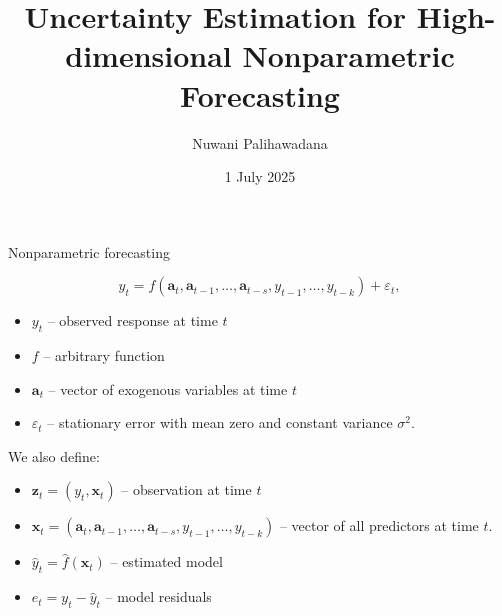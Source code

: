 \documentclass[
  12pt,
  ignorenonframetext,
  aspectratio=169,
]{beamer}
\title{Uncertainty Estimation for High-dimensional Nonparametric
Forecasting}
\author{Nuwani Palihawadana}
\date{1 July 2025}
\begin{document}
\frame{\titlepage}


\begin{frame}{Nonparametric forecasting}
\label{nonparametric-forecasting}
\begin{block}{}
$$
 y_t = f(\bm{a}_{t}, \bm{a}_{t-1}, \dots,\bm{a}_{t-s}, y_{t-1},\dots,y_{t-k}) + \varepsilon_{t},
$$
\end{block}

\begin{itemize}
  \item \small \color{black} $y_{t}$ -- \color{violet} observed response at time $t$
  \item \small \color{black} $f$ -- \color{violet} arbitrary function
  \item \small \color{black} $\bm{a}_{t}$ -- \color{violet} vector of exogenous variables at time $t$
  \item \small \color{black} $\varepsilon_{t}$ -- \color{violet} stationary error with mean zero and constant variance $\sigma^2$. 
\end{itemize}

\pause

We also define:

\begin{itemize}
  \item \small \color{black} $\bm{z}_{t} = (y_{t}, \bm{x}_{t})$ -- \color{violet} observation at time $t$
  \item \small \color{black} $\bm{x}_{t} = (\bm{a}_{t}, \bm{a}_{t-1}, \dots,\bm{a}_{t-s}, y_{t-1},\dots,y_{t-k})$ -- \color{violet} vector of all predictors at time $t$.
  \item \small \color{black} $\hat{y}_{t} = \hat{f}(\bm{x}_{t})$  -- \color{violet} estimated model
  \item \small \color{black} $e_{t} = y_{t} - \hat{y}_{t}$  -- \color{violet} model residuals
\end{itemize}
\end{frame}
\end{document}
